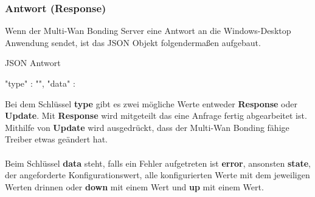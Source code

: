 \subsubsection{Antwort (Response)}
Wenn der Multi-Wan Bonding Server eine Antwort an die Windows-Desktop Anwendung sendet, ist das JSON Objekt folgendermaßen aufgebaut.
\begin{program}[H]
\caption{JSON Antwort}
\begin{GenericCode}
    {
        "type" :  "",
        "data" : {}
    }
\end{GenericCode}
\end{program}
\newpage
\noindent
Bei dem Schlüssel \textbf{type} gibt es zwei mögliche Werte entweder \textbf{Response} oder \textbf{Update}. Mit \textbf{Response} wird mitgeteilt das eine Anfrage fertig abgearbeitet ist. Mithilfe von \textbf{Update} wird ausgedrückt, dass der Multi-Wan Bonding fähige Treiber etwas geändert hat.
\\\\
Beim Schlüssel \textbf{data} steht, falls ein Fehler aufgetreten ist \textbf{error}, ansonsten \textbf{state}, der angeforderte Konfigurationswert, alle konfigurierten Werte mit dem jeweiligen Werten drinnen oder \textbf{down} mit einem Wert und \textbf{up} mit einem Wert.  



